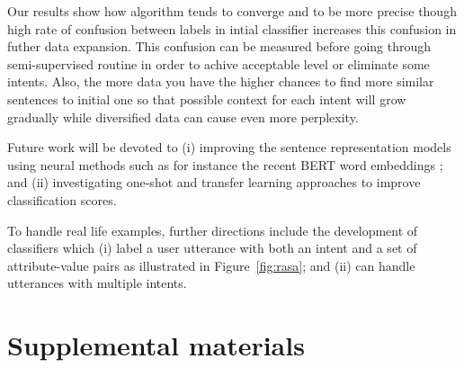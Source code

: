 \documentclass[11pt]{article}
\begin{document}
Our results show how algorithm tends to converge and to be more
precise though high rate of confusion between labels in intial
classifier increases this confusion in futher data expansion. This
confusion can be measured before going through semi-supervised routine
in order to achive acceptable level or eliminate some intents. Also,
the more data you have the higher chances to find more similar
sentences to initial one so that possible context for each intent will
grow gradually while diversified data can cause even more perplexity.

Future work will be devoted to (i) improving the sentence
representation models using neural methods such as for instance the
recent BERT word embeddings \cite{devlin2018bert}; and (ii) investigating one-shot \cite{koch2015siamese} and transfer learning approaches \cite{huang2017zero} to improve classification
scores.

To handle real life examples, further directions include the development of classifiers which (i) label a user utterance with both an intent and a set of attribute-value pairs as illustrated in Figure~\ref{fig:rasa}; and (ii) can handle utterances with multiple intents. 






\clearpage
\section{Supplemental materials}
\end{document}

